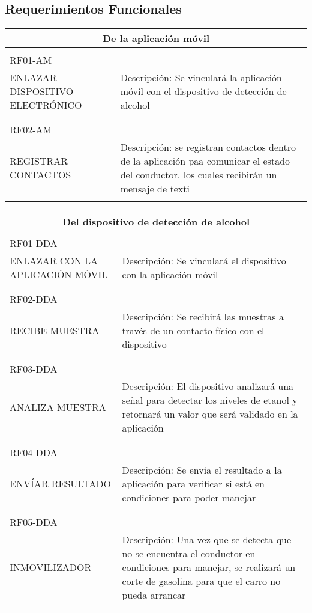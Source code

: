 \subsection{Requerimientos Funcionales} 
  
  \begin{center}
   \begin{tabular}{|p{5.5cm}|p{7cm}|}
     \hline
     \multicolumn{2}{|c|}{De la aplicación móvil} \\ \hline
     \\ RF01-AM  \\ ENLAZAR DISPOSITIVO ELECTRÓNICO & Descripción: Se vinculará la aplicación móvil con el dispositivo de detección de alcohol \\ \\ \hline
     \\ RF02-AM \\ REGISTRAR CONTACTOS & Descripción: se registran contactos dentro de la aplicación paa comunicar el estado del conductor, los cuales recibirán un mensaje de texti \\ \\ \hline
   \end{tabular}
 \end{center}  


  
    \begin{center}
   \begin{tabular}[b]{| p{5.5cm} | p{7cm} |}
     \hline
     \multicolumn{2}{|c|}{Del dispositivo de detección de alcohol} \\ \hline
     \\ RF01-DDA \\ ENLAZAR CON LA APLICACIÓN MÓVIL & Descripción: Se vinculará el dispositivo con la aplicación móvil \\ \\ \hline
     \\ RF02-DDA \\ RECIBE MUESTRA & Descripción: Se recibirá las muestras a través de un contacto físico con el dispositivo \\ \\ \hline
     \\ RF03-DDA \\ ANALIZA MUESTRA & Descripción: El dispositivo analizará una señal para detectar los niveles de etanol y retornará un valor que será validado en la aplicación \\ \\ \hline
     \\ RF04-DDA \\ ENVÍAR RESULTADO & Descripción: Se envía el resultado a la aplicación para verificar si está en condiciones para poder manejar \\ \\ \hline
     \\ RF05-DDA \\ INMOVILIZADOR & Descripción: Una vez que se detecta que no se encuentra el conductor en condiciones para manejar, se realizará
  un corte de gasolina para que el carro no pueda arrancar \\ \\ \hline
   \end{tabular}
 \end{center}
